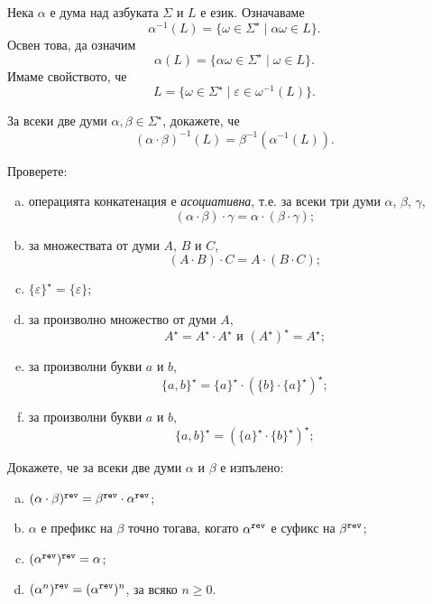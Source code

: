 
Нека $\alpha$ е дума над азбуката $\Sigma$  и $L$ е език. Означаваме 
\[\alpha^{-1}(L) = \{\omega \in \Sigma^\star \mid \alpha\omega \in L\}.\]
Освен това, да означим 
\[\alpha(L) = \{\alpha\omega \in \Sigma^\star \mid \omega \in L\}.\]
Имаме свойството, че
\[L = \{\omega \in \Sigma^\star \mid \varepsilon \in \omega^{-1}(L)\}.\]

\begin{problem}
  \label{prob:pullback}
  За всеки две думи $\alpha, \beta \in \Sigma^\star$, докажете, че
  \[(\alpha\cdot\beta)^{-1}(L) = \beta^{-1}(\alpha^{-1}(L)).\]
\end{problem}

\begin{problem}
  Проверете:
  \begin{enumerate}[a)]
  \item 
    операцията конкатенация е {\em асоциативна}, т.е. за всеки три думи $\alpha$, $\beta$, $\gamma$,
    \[(\alpha\cdot\beta)\cdot\gamma = \alpha\cdot(\beta\cdot\gamma);\]
  \item
    за множествата от думи $A$, $B$ и $C$,
    \[(A\cdot B)\cdot C = A\cdot (B\cdot C);\]
  \item
    $\{\varepsilon\}^\star = \{\varepsilon\}$;
  \item
    за произволно множество от думи $A$,
    \[A^\star = A^\star\cdot A^\star\text{ и }(A^\star)^\star = A^\star;\]
  \item
    за произволни букви $a$ и $b$,
    \[\{a,b\}^\star = \{a\}^\star\cdot(\{b\}\cdot\{a\}^\star)^\star;\]
  \item
    за произволни букви $a$ и $b$,
    \[\{a,b\}^\star = (\{a\}^\star\cdot \{b\}^\star)^\star;\]
  \end{enumerate}
\end{problem}


\begin{problem}
  Докажете, че за всеки две думи $\alpha$ и $\beta$ е изпълено:
  \begin{enumerate}[a)]
  \item 
    $(\alpha\cdot\beta)^{\texttt{rev}} = \beta^{\texttt{rev}}\cdot\alpha^{\texttt{rev}}$;
  \item
    $\alpha$ е префикс на $\beta$ точно тогава, когато $\alpha^{\texttt{rev}}$ е суфикс на $\beta^{\texttt{rev}}$;
  \item
    $(\alpha^{\texttt{rev}})^{\texttt{rev}} = \alpha$;
  \item
    $(\alpha^n)^{\texttt{rev}} = (\alpha^{\texttt{rev}})^n$, за всяко $n \geq 0$.
  \end{enumerate}
\end{problem}

